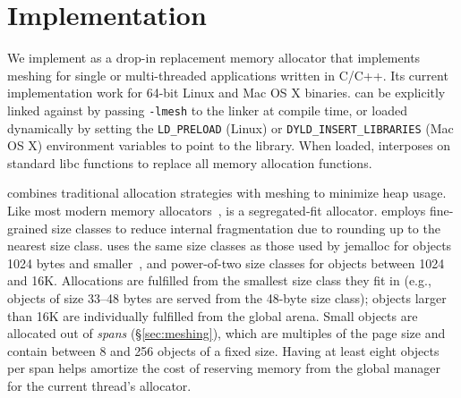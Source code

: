 \section{Implementation}
\label{sec:allocator}

We implement \Mesh as a drop-in replacement memory allocator that
implements meshing for single or multi-threaded applications written
in C/C++. Its current implementation work for 64-bit Linux and Mac OS
X binaries. \Mesh can be explicitly linked against by passing
\texttt{-lmesh} to the linker at compile time, or loaded dynamically
by setting the \texttt{LD\_PRELOAD} (Linux) or
\texttt{DYLD\_INSERT\_LIBRARIES} (Mac OS X) environment variables to
point to the \Mesh{} library. When loaded, \Mesh interposes on
standard libc functions to replace all memory allocation functions.

\Mesh combines traditional allocation strategies with meshing to
minimize heap usage.  Like most modern memory
allocators~\cite{Novark:2010:DSH:1866307.1866371,1134000,379232,evans2006scalable,ghemawattcmalloc},
\Mesh is a segregated-fit allocator. \Mesh{} employs fine-grained size
classes to reduce internal fragmentation due to rounding up to the
nearest size class. \Mesh{} uses the same size classes as those
used by jemalloc for objects 1024 bytes and
smaller~\cite{evans2006scalable}, and power-of-two size classes for
objects between 1024 and 16K.  Allocations are fulfilled from the
smallest size class they fit in (e.g., objects of size 33--48 bytes
are served from the 48-byte size class); objects larger than 16K are
individually fulfilled from the global arena.  Small objects are
allocated out of \textit{spans} (\S\ref{sec:meshing}), which are
multiples of the page size and contain between 8 and 256 objects of a
fixed size.  Having at least eight objects per span helps
amortize the cost of reserving memory from the global manager for
the current thread's allocator.

